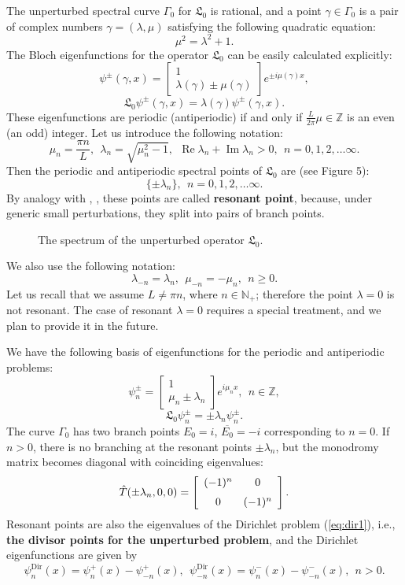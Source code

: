 \documentclass[12pt]{article}
\newcommand{\NN}{{\mathbb N}}
\newcommand{\ZZ}{{\mathbb Z}}
\newcommand{\LG}{\mathfrak L}
\renewcommand{\Re}{\mathop{\mathrm{Re}}}
\renewcommand{\Im}{\mathop{\mathrm{Im}}}
\begin{document}
The unperturbed spectral curve $\Gamma_0$  for $\LG_0$ is rational, and a point $\gamma\in\Gamma_0$ is a pair of complex numbers
$\gamma=(\lambda,\mu)$ satisfying the following quadratic equation:
$$
\mu^2=\lambda^2+1.
$$
The Bloch eigenfunctions for the operator $\LG_0$ can be easily calculated explicitly:
\begin{equation}
\label{eq:bloch3}
\psi^{\pm}(\gamma,x)=\left[\begin {array}{c} 1 \\ \lambda(\gamma)\pm \mu(\gamma) \end {array} \right ] e^{\pm i\mu(\gamma) x},
\end{equation}
$$
\LG_0 \psi^{\pm}(\gamma,x) = \lambda(\gamma)  \psi^{\pm}(\gamma,x).
$$
These eigenfunctions are periodic (antiperiodic) if and only if $\frac{L}{2\pi}\mu\in\ZZ$ is an even (an odd) integer. Let us introduce the following notation:
$$
\mu_n = \frac{\pi n}{L}, \ \ \lambda_n= \sqrt{\mu_n^2-1}, \ \ \Re{\lambda_n}+\Im{\lambda_n}>0, \ \  
n=0,1,2,\ldots\infty.
$$
Then the periodic and antiperiodic spectral points of $\LG_0$ are (see Figure 5):
$$
\{\pm\lambda_n\}, \ \ n=0,1,2,\ldots\infty.
$$
By analogy with \cite{Krichever2}, \cite{Krichever3}, these points are called \textbf{resonant point}, because, under generic small perturbations, they split into pairs of branch points.
\begin{figure}[H]
\centering
\mbox{\epsfxsize=6cm}
\caption{The spectrum of the unperturbed operator $\LG_0$.}
\end{figure}
We also use the following notation:
$$
\lambda_{-n} = \lambda_n, \ \ \mu_{-n} = -\mu_n, \ \ n\ge 0.
$$
Let us recall that we assume $L\ne\pi n$, where $n\in\NN_+$; therefore the point $\lambda=0$ is not resonant. The case of resonant $\lambda=0$ requires a special treatment, and we plan to provide it in the future.

We have the following basis of eigenfunctions for the periodic and antiperiodic problems:
\begin{equation}
\label{eq:basis1}
\psi^{\pm}_{n}=\left[\begin {array}{c} 1 \\ \mu_n\pm\lambda_n \end {array} \right ] e^{i{\mu_n}x}, \ \ n\in\ZZ,
\end{equation}
$$
\LG_0\psi^{\pm}_{n}=\pm\lambda_{n} \psi^{\pm}_{n}.
$$
The curve $\Gamma_0$ has two branch points $E_0=i$, $\overline{E_0}=-i$ corresponding to $n=0$. If $n>0$, there is no 
branching at the resonant points $\pm\lambda_n$, but the monodromy matrix becomes diagonal with coinciding eigenvalues:
$$
\hat T(\pm\lambda_n,0,0)= \left [\begin {array}{cc} (-1)^n &  0
\\ \noalign{\medskip} 0 & (-1)^n \end {array}
\right ].
$$
Resonant points are also the eigenvalues of the Dirichlet problem (\ref{eq:dir1}), i.e., \textbf{the divisor points for the unperturbed problem}, 
and the Dirichlet eigenfunctions are given by
$$
\psi^{\mbox{Dir}}_{n}(x)=\psi^{+}_{n}(x)-\psi^{+}_{-n}(x), \ \  \psi^{\mbox{Dir}}_{-n}(x)=\psi^{-}_{n}(x)-\psi^{-}_{-n}(x),  \ \ n>0.
$$
\end{document}
